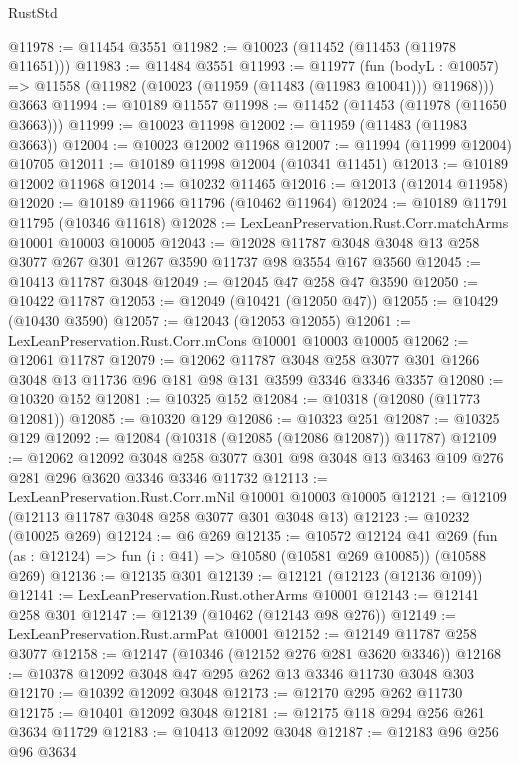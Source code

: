 \begin{lexlean}{RustStd}
\begin{coremodule}
@11978 := @11454 @3551
@11982 := @10023 (@11452 (@11453 (@11978 @11651)))
@11983 := @11484 @3551
@11993 := @11977
    (fun (bodyL : @10057) => @11558 (@11982 (@10023 (@11959 (@11483 (@11983 @10041))) @11968)))
    @3663
@11994 := @10189 @11557
@11998 := @11452 (@11453 (@11978 (@11650 @3663)))
@11999 := @10023 @11998
@12002 := @11959 (@11483 (@11983 @3663))
@12004 := @10023 @12002 @11968
@12007 := @11994 (@11999 @12004) @10705
@12011 := @10189 @11998 @12004 (@10341 @11451)
@12013 := @10189 @12002 @11968
@12014 := @10232 @11465
@12016 := @12013 (@12014 @11958)
@12020 := @10189 @11966 @11796 (@10462 @11964)
@12024 := @10189 @11791 @11795 (@10346 @11618)
@12028 := LexLeanPreservation.Rust.Corr.matchArms @10001 @10003 @10005
@12043 := @12028 @11787 @3048 @3048 @13 @258 @3077 @267 @301 @1267 @3590 @11737 @98 @3554 @167 @3560
@12045 := @10413 @11787 @3048
@12049 := @12045 @47 @258 @47 @3590
@12050 := @10422 @11787
@12053 := @12049 (@10421 (@12050 @47))
@12055 := @10429 (@10430 @3590)
@12057 := @12043 (@12053 @12055)
@12061 := LexLeanPreservation.Rust.Corr.mCons @10001 @10003 @10005
@12062 := @12061 @11787
@12079 := @12062
    @11787
    @3048
    @258
    @3077
    @301
    @1266
    @3048
    @13
    @11736
    @96
    @181
    @98
    @131
    @3599
    @3346
    @3346
    @3357
@12080 := @10320 @152
@12081 := @10325 @152
@12084 := @10318 (@12080 (@11773 @12081))
@12085 := @10320 @129
@12086 := @10323 @251
@12087 := @10325 @129
@12092 := @12084 (@10318 (@12085 (@12086 @12087)) @11787)
@12109 := @12062
    @12092
    @3048
    @258
    @3077
    @301
    @98
    @3048
    @13
    @3463
    @109
    @276
    @281
    @296
    @3620
    @3346
    @3346
    @11732
@12113 := LexLeanPreservation.Rust.Corr.mNil @10001 @10003 @10005
@12121 := @12109 (@12113 @11787 @3048 @258 @3077 @301 @3048 @13)
@12123 := @10232 (@10025 @269)
@12124 := @6 @269
@12135 := @10572
    @12124
    @41
    @269
    (fun (as : @12124) => fun (i : @41) => @10580 (@10581 @269 @10085))
    (@10588 @269)
@12136 := @12135 @301
@12139 := @12121 (@12123 (@12136 @109))
@12141 := LexLeanPreservation.Rust.otherArms @10001
@12143 := @12141 @258 @301
@12147 := @12139 (@10462 (@12143 @98 @276))
@12149 := LexLeanPreservation.Rust.armPat @10001
@12152 := @12149 @11787 @258 @3077
@12158 := @12147 (@10346 (@12152 @276 @281 @3620 @3346))
@12168 := @10378 @12092 @3048 @47 @295 @262 @13 @3346 @11730 @3048 @303
@12170 := @10392 @12092 @3048
@12173 := @12170 @295 @262 @11730
@12175 := @10401 @12092 @3048
@12181 := @12175 @118 @294 @256 @261 @3634 @11729
@12183 := @10413 @12092 @3048
@12187 := @12183 @96 @256 @96 @3634

\end{coremodule}
\end{lexlean}
